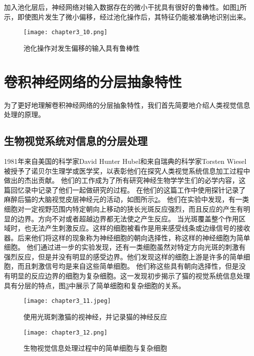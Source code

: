 加入池化层后，神经网络对输入数据存在的微小干扰具有很好的鲁棒性。如图\ref{fig:chapter3_10}所示，即使图片发生了微小偏移，经过池化操作后，其特征仍能被准确地识别出来。
\begin{figure}
    \centering
    \texttt{[image: chapter3\_10.png]}
    \caption{池化操作对发生偏移的输入具有鲁棒性\cite{luyujie_216}}
    \label{fig:chapter3_10}
\end{figure}

\section{卷积神经网络的分层抽象特性}
为了更好地理解卷积神经网络的分层抽象特性，我们首先简要地介绍人类视觉信息处理的原理。
\subsection{生物视觉系统对信息的分层处理}
1981年来自美国的科学家David Hunter Hubel和来自瑞典的科学家Torsten Wiesel被授予了诺贝尔生理学或医学奖，以表彰他们在探究人类视觉系统信息加工过程中做出的杰出贡献。
他们的工作成为了所有研究神经生物学学生们的必学内容，这篇回忆录\cite{Hubel1998EarlyEO}中记录了他们一起做研究的过程。
在他们的这篇工作\cite{https://doi.org/10.1113/jphysiol.1959.sp006308}中使用探针记录了麻醉后猫的大脑视觉皮层神经元的活动，如图所示\ref{fig:chapter3_11}。
他们在实验中发现，有一类细胞对一定视野范围内特定朝向上移动的狭长光斑反应强烈，而且反应的产生有明显的边界。方向不对或者超越边界都无法使之产生反应。
当光斑覆盖整个作用区域时，也无法产生刺激反应。这样的细胞被看作是用来感受线条或边缘信号的接收器。后来他们将这样的现象称为神经细胞的朝向选择性，称这样的神经细胞为简单细胞。
他们通过进一步的实验发现，还有一类细胞虽然对特定方向光斑的刺激有强烈反应，但是并没有明显的感受边界。他们发现这样的细胞上游是许多的简单细胞，而且刺激信号均是来自这些简单细胞。
他们称这些具有朝向选择性，但是没有明显的反应边界的细胞为复杂细胞。这一发现初步揭示了猫的视觉系统信息处理具有分层的特点，图\ref{fig:chapter3_12}中展示了简单细胞和复杂细胞的关系。
\begin{figure}
    \centering
    \texttt{[image: chapter3\_11.jpeg]}
    \caption{使用光斑刺激猫的视神经，并记录猫的神经反应\cite{yanjianweishi}}
    \label{fig:chapter3_11}
\end{figure}

\begin{figure}
    \centering
    \texttt{[image: chapter3\_12.png]}
    \caption{生物视觉信息处理过程中的简单细胞与复杂细胞\cite{hubel1962}}
    \label{fig:chapter3_12}
\end{figure}

